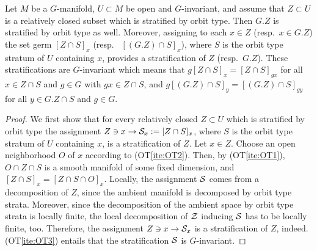 \begin{proposition}
   Let $M$ be a $G$-manifold, $U\subset M$ be open and $G$-invariant, and assume that $Z \subset U$ is a 
   relatively closed subset which is stratified by orbit type. 
   Then $G.Z$ is stratified by orbit type as well.
   Moreover, assigning to each $x\in Z$ (resp.~$x\in G.Z$) the set germ $[Z\cap S]_x$ 
   (resp.~ $[(G.Z)\cap S]_x$), where $S$ is the orbit type stratum of $U$ containing $x$,
   provides a stratification of $Z$ (resp.~$G.Z$). These stratifications are $G$-invariant which means that
   $g [Z\cap S]_x  = [Z\cap S]_{gx}$ for all $x \in Z\cap S$ and $g\in G$ with $gx \in  Z\cap S$, and  
   $g [(G.Z)\cap S]_y  = [(G.Z)\cap S]_{gy}$ for all $y \in G.Z\cap S$ and $g\in G$.
\end{proposition}
\begin{proof}
   We first show that for every relatively closed $Z \subset U$ which is stratified by orbit type the assignment
   $Z \ni x \to \mathcal{S}_x := [Z\cap S]_x$, where $S$ is the orbit type stratum of $U$ containing $x$, is 
   a stratification of $Z$. Let $x \in Z$. Choose an open neighborhood $O$ of $x$ according to   (OT\ref{ite:OT2}).
   Then, by (OT\ref{ite:OT1}), $O \cap Z\cap S$ is a smooth manifold of some fixed dimension, and 
   $[Z\cap S]_x =  [Z\cap S \cap O]_x$. Locally, the assignment $\mathcal{S}$ comes from a decomposition of $Z$, since
   the ambient manifold is decomposed by orbit type strata. Moreover,  since the decomposition  of the ambient space 
   by orbit type strata is locally finite, the local decomposition of $\mathcal{Z}$ inducing $\mathcal{S}$ has to be locally finite, 
   too. Therefore, the assignment  $Z \ni x \to \mathcal{S}_x $ is a stratification of $Z$, indeed. 
   (OT\ref{ite:OT3}) entails that the stratification $\mathcal{S}$ is $G$-invariant.
 

\end{proof}
